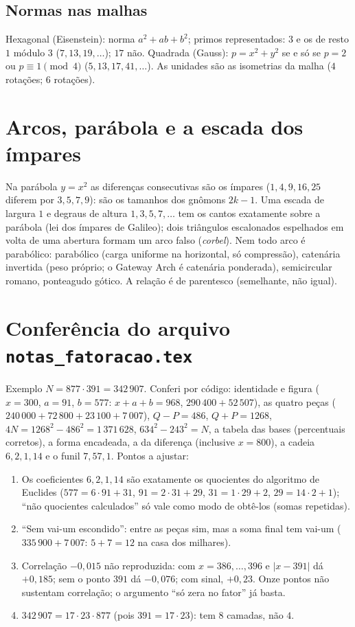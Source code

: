 \documentclass[11pt,a4paper]{article}
\begin{document}
\subsection{Normas nas malhas}
Hexagonal (Eisenstein): norma $a^2+ab+b^2$; primos representados: $3$ e os de resto $1$ módulo $3$ ($7,13,19,\dots$); $17$ não. Quadrada (Gauss): $p=x^2+y^2$ se e só se $p=2$ ou $p\equiv1 \pmod 4$ ($5,13,17,41,\dots$). As unidades são as isometrias da malha ($4$ rotações; $6$ rotações).

\section{Arcos, parábola e a escada dos ímpares}
Na parábola $y=x^2$ as diferenças consecutivas são os ímpares ($1,4,9,16,25$ diferem por $3,5,7,9$): são os tamanhos dos gnômons $2k-1$. Uma escada de largura $1$ e degraus de altura $1,3,5,7,\dots$ tem os cantos exatamente sobre a parábola (lei dos ímpares de Galileo); dois triângulos escalonados espelhados em volta de uma abertura formam um arco falso (\emph{corbel}). Nem todo arco é parabólico: parabólico (carga uniforme na horizontal, só compressão), catenária invertida (peso próprio; o Gateway Arch é catenária ponderada), semicircular romano, ponteagudo gótico. A relação é de parentesco (semelhante, não igual).

\section{Conferência do arquivo \texttt{notas\_fatoracao.tex}}
Exemplo $N=877\cdot391=342\,907$. Conferi por código: identidade e figura ($x=300$, $a=91$, $b=577$: $x+a+b=968$, $290\,400+52\,507$), as quatro peças ($240\,000+72\,800+23\,100+7\,007$), $Q-P=486$, $Q+P=1268$, $4N=1268^2-486^2=1\,371\,628$, $634^2-243^2=N$, a tabela das bases (percentuais corretos), a forma encadeada, a da diferença (inclusive $x=800$), a cadeia $6,2,1,14$ e o funil $7,57,1$. Pontos a ajustar:
\begin{enumerate}[leftmargin=1.6em]
  \item Os coeficientes $6,2,1,14$ são exatamente os quocientes do algoritmo de Euclides ($577=6\cdot91+31$, $91=2\cdot31+29$, $31=1\cdot29+2$, $29=14\cdot2+1$); ``não quocientes calculados'' só vale como modo de obtê-los (somas repetidas).
  \item ``Sem vai-um escondido'': entre as peças sim, mas a soma final tem vai-um ($335\,900+7\,007$: $5+7=12$ na casa dos milhares).
  \item Correlação $-0{,}015$ não reproduzida: com $x=386,\dots,396$ e $|x-391|$ dá $+0{,}185$; sem o ponto $391$ dá $-0{,}076$; com sinal, $+0{,}23$. Onze pontos não sustentam correlação; o argumento ``só zera no fator'' já basta.
  \item $342\,907=17\cdot23\cdot877$ (pois $391=17\cdot23$): tem $8$ camadas, não $4$.
\end{enumerate}
\end{document}
